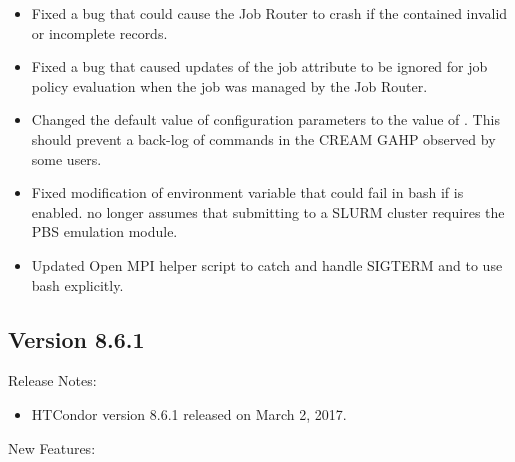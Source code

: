 \begin{itemize}
\item Fixed a bug that could cause the Job Router to crash if the
 contained invalid or incomplete records.

\item Fixed a bug that caused updates of the job attribute
 to be ignored for job policy evaluation
when the job was managed by the Job Router.

\item Changed the default value of configuration parameters
 to the value of
.
This should prevent a back-log of commands in the CREAM GAHP observed
by some users.

\item Fixed modification of  environment variable that
could fail in bash if  is enabled.
 no longer assumes that submitting to a SLURM
cluster requires the PBS emulation module.

\item Updated Open MPI helper script to catch and handle SIGTERM and 
to use bash explicitly.

\end{itemize}

\subsection*{\label{sec:New-8-6-1}Version 8.6.1}

\noindent Release Notes:

\begin{itemize}

\item HTCondor version 8.6.1 released on March 2, 2017.

\end{itemize}


\noindent New Features:

